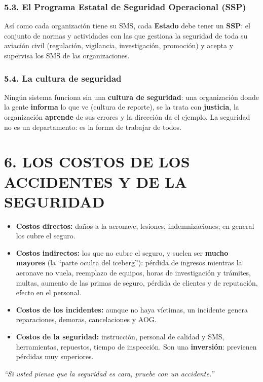 \subsubsection*{5.3. El Programa Estatal de Seguridad Operacional (SSP)}
Así como cada organización tiene su SMS, cada \textbf{Estado} debe tener un \textbf{SSP}: el
conjunto de normas y actividades con las que gestiona la seguridad de toda su aviación civil
(regulación, vigilancia, investigación, promoción) y acepta y supervisa los SMS de las
organizaciones.

\subsubsection*{5.4. La cultura de seguridad}
Ningún sistema funciona sin una \textbf{cultura de seguridad}: una organización donde la gente
\textbf{informa} lo que ve (cultura de reporte), se la trata con \textbf{justicia}, la
organización \textbf{aprende} de sus errores y la dirección da el ejemplo. La seguridad no es un
departamento: es la forma de trabajar de todos.

\section*{6. LOS COSTOS DE LOS ACCIDENTES Y DE LA SEGURIDAD}

\begin{itemize}
  \item \textbf{Costos directos:} daños a la aeronave, lesiones, indemnizaciones; en general los
        cubre el seguro.
  \item \textbf{Costos indirectos:} los que no cubre el seguro, y suelen ser \textbf{mucho
        mayores} (la ``parte oculta del iceberg''): pérdida de ingresos mientras la aeronave no
        vuela, reemplazo de equipos, horas de investigación y trámites, multas, aumento de las
        primas de seguro, pérdida de clientes y de reputación, efecto en el personal.
  \item \textbf{Costos de los incidentes:} aunque no haya víctimas, un incidente genera
        reparaciones, demoras, cancelaciones y AOG.
  \item \textbf{Costos de la seguridad:} instrucción, personal de calidad y SMS, herramientas,
        repuestos, tiempo de inspección. Son una \textbf{inversión}: previenen pérdidas muy
        superiores.
\end{itemize}
\textit{``Si usted piensa que la seguridad es cara, pruebe con un accidente.''}

